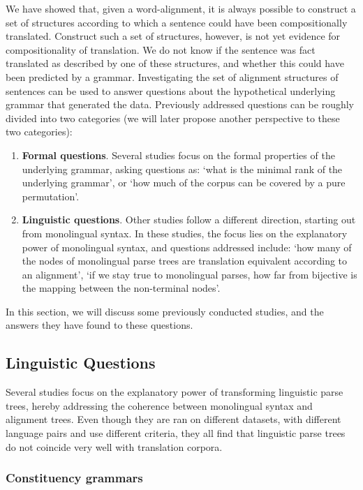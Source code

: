 We have showed that, given a word-alignment, it is always possible to construct a set of structures according to which a sentence could have been compositionally translated. Construct such a set of structures, however, is not yet evidence for compositionality of translation. We do not know if the sentence was fact translated as described by one of these structures, and whether this could have been predicted by a grammar. Investigating the set of alignment structures of sentences can be used to answer questions about the hypothetical underlying grammar that generated the data. Previously addressed questions can be roughly divided into two categories (we will later propose another perspective to these two categories):\begin{enumerate}%
\item \textbf{Formal questions}. Several studies focus on the formal properties of the underlying grammar, asking questions as: `what is the minimal rank of the underlying grammar', or `how much of the corpus can be covered by a pure permutation'.
\item \textbf{Linguistic questions}. Other studies follow a different direction, starting out from monolingual syntax. In these studies, the focus lies on the explanatory power of monolingual syntax, and questions addressed include: `how many of the nodes of monolingual parse trees are translation equivalent according to an alignment', `if we stay true to monolingual parses, how far from bijective is the mapping between the non-terminal nodes'.
\end{enumerate}

In this section, we will discuss some previously conducted studies, and the answers they have found to these questions.

\subsection{Linguistic Questions}

Several studies focus on the explanatory power of transforming linguistic parse trees, hereby addressing the coherence between monolingual syntax and alignment trees. Even though they are ran on different datasets, with different language pairs and use different criteria, they all find that linguistic parse trees do not coincide very well with translation corpora.

\subsubsection{Constituency grammars}

